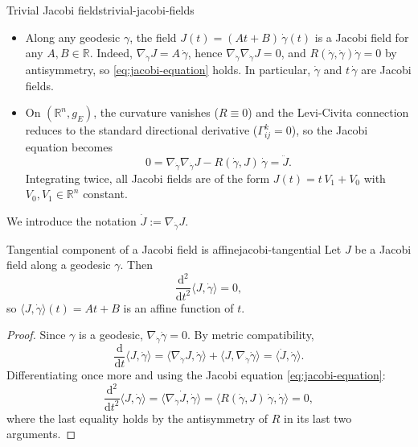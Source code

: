 \begin{colexample}{Trivial Jacobi fields}{trivial-jacobi-fields}
\begin{itemize}
    \item Along any geodesic $\gamma$, the field $J(t) = (At + B)\, \dot\gamma(t)$ is a Jacobi field for any $A, B \in \mathbb{R}$. Indeed, $\nabla_{\dot\gamma} J = A\, \dot\gamma$, hence $\nabla_{\dot\gamma}\nabla_{\dot\gamma} J = 0$, and $R(\dot\gamma, \dot\gamma)\dot\gamma = 0$ by antisymmetry, so \eqref{eq:jacobi-equation} holds. In particular, $\dot\gamma$ and $t\,\dot\gamma$ are Jacobi fields.
    \item On $(\mathbb{R}^n, g_E)$, the curvature vanishes ($R \equiv 0$) and the Levi-Civita connection reduces to the standard directional derivative ($\Gamma^k_{ij} = 0$), so the Jacobi equation becomes
    \[
    0 = \nabla_{\dot\gamma} \nabla_{\dot\gamma} J - R(\dot\gamma, J)\, \dot\gamma = \ddot J.
    \]
    Integrating twice, all Jacobi fields are of the form $J(t) = t\, V_1 + V_0$ with $V_0, V_1 \in \mathbb{R}^n$ constant.
\end{itemize}
\end{colexample}








We introduce the notation $\dot J := \nabla_{\dot\gamma} J$.

\begin{colorlem}{Tangential component of a Jacobi field is affine}{jacobi-tangential}
Let $J$ be a Jacobi field along a geodesic $\gamma$. Then
\[
\frac{\mathrm{d}^2}{\mathrm{d}t^2} \langle J, \dot\gamma \rangle = 0,
\]
so $\langle J, \dot\gamma\rangle(t) = At + B$ is an affine function of $t$.
\end{colorlem}

\begin{proof}
Since $\gamma$ is a geodesic, $\nabla_{\dot\gamma} \dot\gamma = 0$. By metric compatibility,
\[
\frac{\mathrm{d}}{\mathrm{d}t} \langle J, \dot\gamma\rangle = \langle \nabla_{\dot\gamma} J, \dot\gamma\rangle + \langle J, \nabla_{\dot\gamma} \dot\gamma\rangle = \langle \dot J, \dot\gamma\rangle.
\]
Differentiating once more and using the Jacobi equation \eqref{eq:jacobi-equation}:
\[
\frac{\mathrm{d}^2}{\mathrm{d}t^2} \langle J, \dot\gamma\rangle = \langle \nabla_{\dot\gamma} \dot J, \dot\gamma\rangle = \langle R(\dot\gamma, J)\, \dot\gamma, \dot\gamma\rangle = 0,
\]
where the last equality holds by the antisymmetry of $R$ in its last two arguments. \qedhere
\end{proof}

